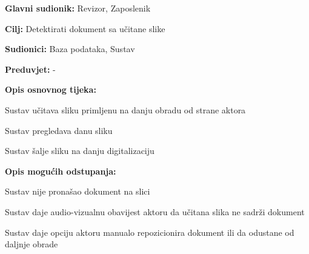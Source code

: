 					\noindent {}
					\begin{packed_item}
						
						\item \textbf{Glavni sudionik: } Revizor, Zaposlenik
						\item \textbf{Cilj:} Detektirati dokument sa učitane slike
						\item \textbf{Sudionici:} Baza podataka, Sustav
						\item \textbf{Preduvjet:} -
						\item \textbf{Opis osnovnog tijeka:}
						
						\item[] \begin{packed_enum}
							
							\item Sustav učitava sliku primljenu na danju obradu od strane aktora
							\item Sustav pregledava danu sliku
							\item Sustav šalje sliku na danju digitalizaciju 
							
						\end{packed_enum}
						
						\item \textbf{Opis mogućih odstupanja:}
						
						\item[] \begin{packed_item}
							
							\item[2.a] Sustav nije pronašao dokument na slici
							\item[] \begin{packed_enum}
								
								\item Sustav daje audio-vizualnu obavijest aktoru da učitana slika ne sadrži dokument
								\item Sustav daje opciju aktoru manualo repozicionira dokument ili da odustane od daljnje obrade
								
							\end{packed_enum}
							
						\end{packed_item}
					\end{packed_item}
					
					
					
					
					
					
					
